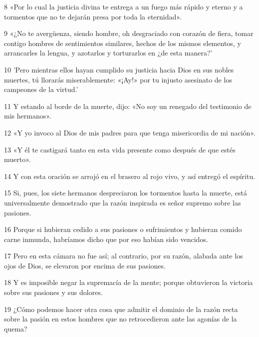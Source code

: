 \par 8 «Por lo cual la justicia divina te entrega a un fuego más rápido y eterno y a tormentos que no te dejarán presa por toda la eternidad».

\par 9 «¿No te avergüenza, siendo hombre, oh desgraciado con corazón de fiera, tomar contigo hombres de sentimientos similares, hechos de los mismos elementos, y arrancarles la lengua, y azotarlos y torturarlos en ¿de esta manera?'

\par 10 'Pero mientras ellos hayan cumplido su justicia hacia Dios en sus nobles muertes, tú llorarás miserablemente: «¡Ay!» por tu injusto asesinato de los campeones de la virtud.'

\par 11 Y estando al borde de la muerte, dijo: «No soy un renegado del testimonio de mis hermanos».

\par 12 «Y yo invoco al Dios de mis padres para que tenga misericordia de mi nación».

\par 13 «Y él te castigará tanto en esta vida presente como después de que estés muerto».

\par 14 Y con esta oración se arrojó en el brasero al rojo vivo, y así entregó el espíritu.

\par 15 Si, pues, los siete hermanos despreciaron los tormentos hasta la muerte, está universalmente demostrado que la razón inspirada es señor supremo sobre las pasiones.

\par 16 Porque si hubieran cedido a sus pasiones o sufrimientos y hubieran comido carne inmunda, habríamos dicho que por eso habían sido vencidos.

\par 17 Pero en esta cámara no fue así; al contrario, por su razón, alabada ante los ojos de Dios, se elevaron por encima de sus pasiones.

\par 18 Y es imposible negar la supremacía de la mente; porque obtuvieron la victoria sobre sus pasiones y sus dolores.

\par 19 ¿Cómo podemos hacer otra cosa que admitir el dominio de la razón recta sobre la pasión en estos hombres que no retrocedieron ante las agonías de la quema?

